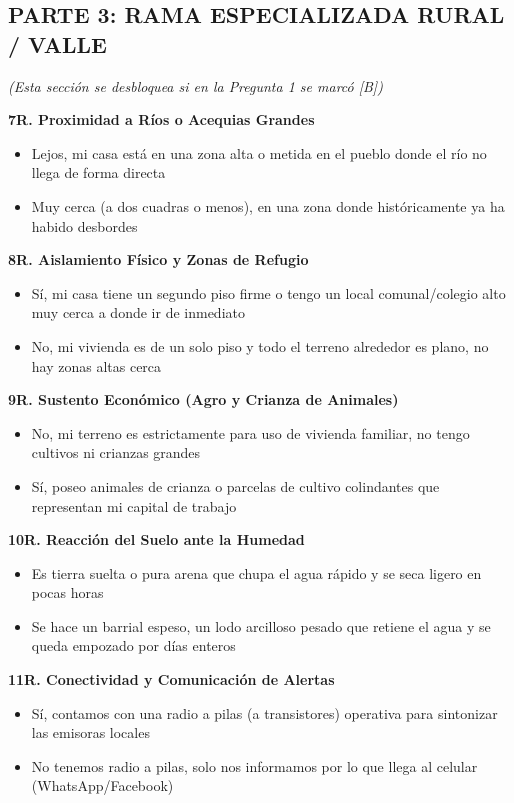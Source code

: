 \documentclass[12pt, letterpaper]{article}
\begin{document}
\subsection*{PARTE 3: RAMA ESPECIALIZADA RURAL / VALLE}
\textit{(Esta sección se desbloquea si en la Pregunta 1 se marcó [B])}

\textbf{7R. Proximidad a Ríos o Acequias Grandes}
\begin{itemize}[label={}]
  \item [A] Lejos, mi casa está en una zona alta o metida en el pueblo donde el río no llega de forma directa
  \item [B] Muy cerca (a dos cuadras o menos), en una zona donde históricamente ya ha habido desbordes
\end{itemize}

\textbf{8R. Aislamiento Físico y Zonas de Refugio}
\begin{itemize}[label={}]
  \item [A] Sí, mi casa tiene un segundo piso firme o tengo un local comunal/colegio alto muy cerca a donde ir de inmediato
  \item [B] No, mi vivienda es de un solo piso y todo el terreno alrededor es plano, no hay zonas altas cerca
\end{itemize}

\textbf{9R. Sustento Económico (Agro y Crianza de Animales)}
\begin{itemize}[label={}]
  \item [A] No, mi terreno es estrictamente para uso de vivienda familiar, no tengo cultivos ni crianzas grandes
  \item [B] Sí, poseo animales de crianza o parcelas de cultivo colindantes que representan mi capital de trabajo
\end{itemize}

\textbf{10R. Reacción del Suelo ante la Humedad}
\begin{itemize}[label={}]
  \item [A] Es tierra suelta o pura arena que chupa el agua rápido y se seca ligero en pocas horas
  \item [B] Se hace un barrial espeso, un lodo arcilloso pesado que retiene el agua y se queda empozado por días enteros
\end{itemize}

\textbf{11R. Conectividad y Comunicación de Alertas}
\begin{itemize}[label={}]
  \item [A] Sí, contamos con una radio a pilas (a transistores) operativa para sintonizar las emisoras locales
  \item [B] No tenemos radio a pilas, solo nos informamos por lo que llega al celular (WhatsApp/Facebook)
\end{itemize}
\end{document}
